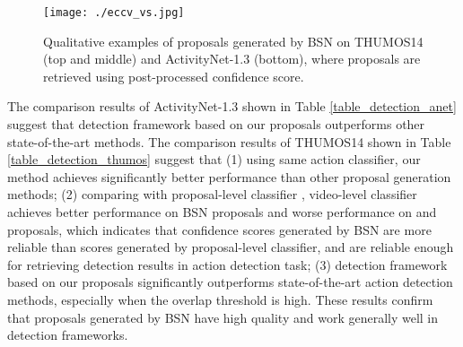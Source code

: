 \documentclass[runningheads]{llncs}
\begin{document}
\begin{figure}[t]
\setlength{\abovecaptionskip}{-0.3cm} %
\setlength{\belowcaptionskip}{-0.3cm} %
\begin{center}
\begin{minipage}[b]{1.0\linewidth}
  \centering
  \centerline{\texttt{[image: ./eccv\_vs.jpg]}}
  \medskip
\end{minipage}
\end{center}
   \caption{Qualitative examples of proposals generated by BSN on THUMOS14 (top and middle) and ActivityNet-1.3 (bottom), where proposals are retrieved using  post-processed confidence score. }
\label{fig_vs}
\vspace{-0.2cm}
\end{figure}

The comparison results of ActivityNet-1.3 shown in Table \ref{table_detection_anet} suggest that  detection framework based on our proposals outperforms other state-of-the-art methods.
The comparison results of THUMOS14 shown in Table \ref{table_detection_thumos} suggest that 
(1) using same action classifier, our method achieves significantly better performance than other proposal generation methods;
%
(2) comparing  with  proposal-level classifier \cite{shou2016action}, video-level classifier \cite{wang2017untrimmednets} achieves better performance on BSN proposals and worse performance  on \cite{sst_buch_cvpr17} and \cite{gao2017turn} proposals, which indicates that confidence scores generated by BSN are more reliable than scores generated by proposal-level classifier, and are reliable enough for retrieving detection results in action detection task;
%
(3) detection framework based on our proposals significantly outperforms  state-of-the-art action detection methods, especially when the overlap threshold is high. 
These results confirm that proposals generated by BSN have high quality and work generally well in detection frameworks. %





\end{document}
